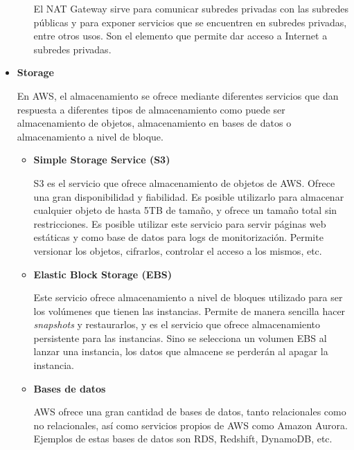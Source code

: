 \documentclass[../../memoria.tex]{subfiles}
\begin{document}
\begin{itemize}
\begin{itemize}
                        El NAT Gateway sirve para comunicar subredes privadas con las subredes públicas y para exponer servicios que se encuentren en subredes privadas, entre otros usos. Son el elemento que permite dar acceso a Internet a subredes privadas.
            \end{itemize}

      \item \textbf{Storage}
            \par
            En AWS, el almacenamiento se ofrece mediante diferentes servicios que dan respuesta a diferentes tipos de almacenamiento como puede ser almacenamiento de objetos, almacenamiento en bases de datos o almacenamiento a nivel de bloque.
            \begin{itemize}
                  \item \textbf{Simple Storage Service (S3)}
                        \par
                        S3 es el servicio que ofrece almacenamiento de objetos de AWS. Ofrece una gran disponibilidad y fiabilidad. Es posible utilizarlo para almacenar cualquier objeto de hasta 5TB de tamaño, y ofrece un tamaño total sin restricciones. Es posible utilizar este servicio para servir páginas web estáticas y como base de datos para logs de monitorización. Permite versionar los objetos, cifrarlos, controlar el acceso a los mismos, etc.
                  \item \textbf{Elastic Block Storage (EBS)}
                        \par
                        Este servicio ofrece almacenamiento a nivel de bloques utilizado para ser los volúmenes que tienen las instancias. Permite de manera sencilla hacer \textit{snapshots} y restaurarlos, y es el servicio que ofrece almacenamiento persistente para las instancias. Sino se selecciona un volumen EBS al lanzar una instancia, los datos que almacene se perderán al apagar la instancia.
                  \item \textbf{Bases de datos}
                        \par
                        AWS ofrece una gran cantidad de bases de datos, tanto relacionales como no relacionales, así como servicios propios de AWS como Amazon Aurora. Ejemplos de estas bases de datos son RDS, Redshift, DynamoDB, etc.
            \end{itemize}


\end{itemize}
\end{document}
